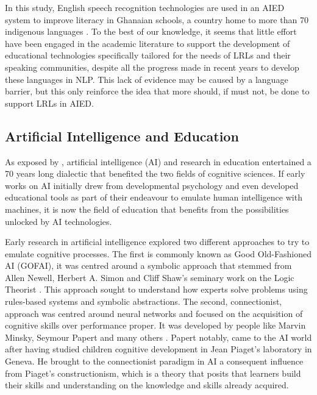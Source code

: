 In this study, English speech recognition technologies are used in an AIED system to improve literacy in Ghanaian schools, a country home to more than 70 indigenous languages \parencite{noauthor_ghana_nodate}.
To the best of our knowledge, it seems that little effort have been engaged in the academic literature to support the development of educational technologies specifically tailored for the needs of LRLs and their speaking communities, despite all the progress made in recent years to develop these languages in NLP\@. This lack of evidence may be caused by a language barrier, but this only reinforce the idea that more should, if must not, be done to support LRLs in AIED\@.

    \subsection{Artificial Intelligence and Education}
As exposed by \textcite{doroudi_intertwined_2023}, artificial intelligence (AI) and research in education entertained a 70 years long dialectic that benefited the two fields of cognitive sciences. If early works on AI initially drew from developmental psychology and even developed educational tools as part of their endeavour to emulate human intelligence with machines, it is now the field of education that benefits from the possibilities unlocked by AI technologies.

Early research in artificial intelligence explored two different approaches to try to emulate cognitive processes. The first is commonly known as Good Old-Fashioned AI (GOFAI), it was centred around a symbolic approach that stemmed from Allen Newell, Herbert A. Simon and Cliff Shaw's seminary work on the Logic Theorist \parencite{newell_logic_1956}. This approach sought to understand how experts solve problems using rules-based systems and symbolic abstractions. The second, connectionist, approach was centred around neural networks and focused on the acquisition of cognitive skills over performance proper. It was developed by people like Marvin Minsky, Seymour Papert and many others \parencite{doroudi_intertwined_2023}. Papert notably, came to the AI world after having studied children cognitive development in Jean Piaget's laboratory in Geneva. He brought to the connectionist paradigm in AI a consequent influence from Piaget's constructionism, which is a theory that posits that learners build their skills and understanding on the knowledge and skills already acquired.

